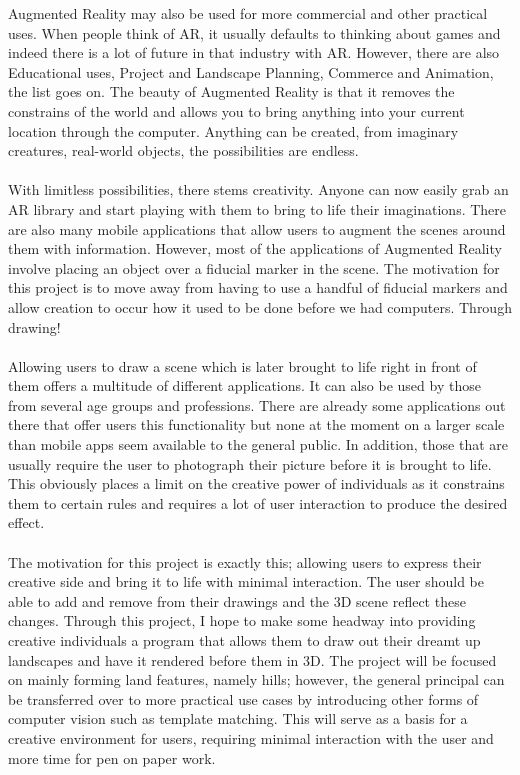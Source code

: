 \documentclass[11pt]{article}
\begin{document}
Augmented Reality may also be used for more commercial and other practical uses. 
When people think of AR, it usually defaults to thinking about games and 
indeed there is a lot of future in that industry with AR. However,
there are also Educational uses, Project and Landscape Planning, 
Commerce and Animation, 
the list goes on. The beauty of Augmented Reality is that it removes
the constrains of the world and allows you to bring anything into your
current location through the computer. Anything can be created, from 
imaginary creatures, real-world objects, the possibilities are endless.\\ 
\\
With limitless possibilities, there stems creativity. Anyone can now
easily grab an AR library and start playing with them to bring to life
their imaginations. There are also many mobile applications that allow
users to augment the scenes around them with information. However, most
of the applications of Augmented Reality involve placing an object over
a fiducial marker in the scene. The motivation for this project is to 
move away from having to use a handful of fiducial markers and allow
creation to occur how it used to be done before we had computers. 
Through drawing!\\
\\
Allowing users to draw a scene which is later brought to life right 
in front of them offers a multitude of different applications. It can
also be used by those from several age groups and professions. There
are already some applications out there that offer users this 
functionality but none at the moment on a larger scale than mobile apps
seem available to the general public. In addition, those that are usually
require the user to photograph their picture before it is brought to life.
This obviously places a limit on the creative power of individuals as
it constrains them to certain rules and requires a lot of user interaction
to produce the desired effect. \\
\\
The motivation for this project is exactly this; allowing users to 
express their creative side and bring it to life with minimal interaction.
The user should be able to add and remove from their drawings and the
3D scene reflect these changes.
Through this project, I hope to make some headway into providing creative
individuals a program that allows them to draw out their dreamt up
landscapes and have it rendered before them in 3D. The project will be focused
on mainly forming land features, namely hills; however, the general principal can be 
transferred over to more practical use cases by introducing other forms of
computer vision such as template matching. This will serve as a basis for a 
creative environment for users, requiring minimal interaction with the user and
more time for pen on paper work.
\end{document}
